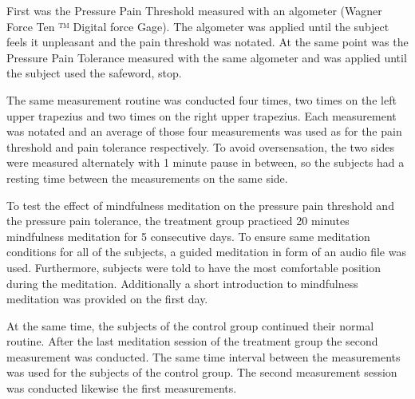 First was the Pressure Pain Threshold measured with an algometer (Wagner Force Ten ™  Digital force Gage). The algometer was applied until the subject feels it unpleasant and the pain threshold was notated. At the same point was the Pressure Pain Tolerance measured with the same algometer and was applied until the subject used the safeword, stop.

The same measurement routine was conducted four times, two times on the left upper trapezius and two times on the right upper trapezius. Each measurement was notated and an average of those four measurements was used as for the pain threshold and pain tolerance respectively. To avoid oversensation, the two sides were measured alternately with 1 minute pause in between, so the subjects had a resting time between the measurements on the same side.  

To test the effect of mindfulness meditation on the pressure pain threshold and the pressure pain tolerance, the treatment group practiced 20 minutes mindfulness meditation for 5 consecutive days. To ensure same meditation conditions for all of the subjects, a guided meditation in form of an audio file was used. Furthermore, subjects were told to have the most comfortable position during the meditation.  Additionally a short introduction to mindfulness meditation was provided on the first day. 

At the same time, the subjects of the control group continued their normal routine.
After the last meditation session of the treatment group the second measurement was conducted. The same time interval between the measurements was used for the subjects of the control group. The second measurement session was conducted likewise the first measurements.



